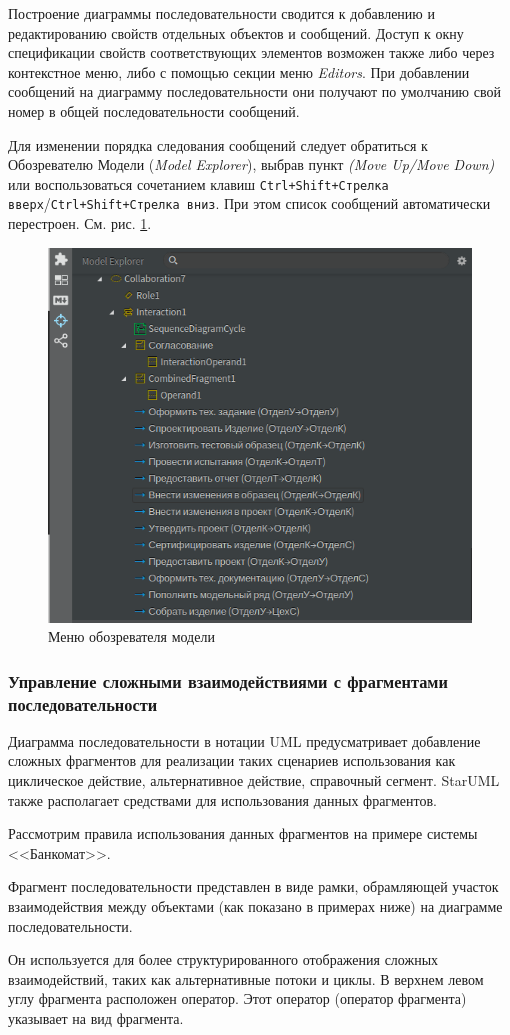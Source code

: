 \documentclass[a4paper,12pt]{extreport}
\newcommand{\staruml}{StarUML\,\tm}
\begin{document}
Построение диаграммы последовательности сводится к добавлению и редактированию свойств отдельных объектов и сообщений. Доступ к окну спецификации свойств соответствующих элементов возможен также либо через контекстное меню, либо с помощью секции меню \textit{Editors}. При добавлении сообщений на диаграмму последовательности они получают по умолчанию свой номер в общей последовательности сообщений.

Для изменении порядка следования сообщений следует обратиться к Обозревателю Модели (\textit{Model Explorer}), выбрав пункт \textit{(Move Up/Move Down)} или воспользоваться сочетанием клавиш \texttt{Ctrl+Shift+Стрелка вверх}/\texttt{Ctrl+Shift+Стрелка вниз}. При этом список сообщений автоматически перестроен. См. рис. \ref{fig:sequenceexplorer}.

\begin{figure}[h!]
	\centering
	\includegraphics[width=0.4\linewidth]{images/sequenceexplorer}
	\caption{Меню обозревателя модели}
	\label{fig:sequenceexplorer}
\end{figure}

\subsubsection*{Управление сложными взаимодействиями с фрагментами последовательности}

Диаграмма последовательности в нотации UML предусматривает добавление сложных фрагментов для реализации таких сценариев использования как циклическое действие, альтернативное действие, справочный сегмент. \staruml также располагает средствами для использования данных фрагментов. 

Рассмотрим правила использования данных фрагментов на примере системы <<Банкомат>>.

Фрагмент последовательности представлен в виде рамки, обрамляющей участок взаимодействия между объектами (как показано в примерах ниже) на диаграмме последовательности.

Он используется для более структурированного отображения сложных взаимодействий, таких как альтернативные потоки и циклы. В верхнем левом углу фрагмента расположен оператор. Этот оператор (оператор фрагмента) указывает на вид фрагмента.
\end{document}
